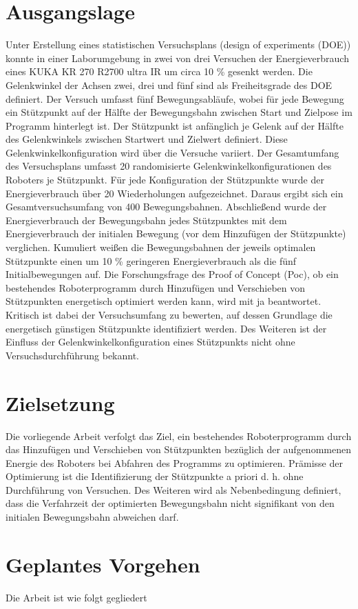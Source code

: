 \section{Ausgangslage}
Unter Erstellung eines statistischen Versuchsplans (design of experiments (DOE)) konnte in einer Laborumgebung in zwei von drei Versuchen der Energieverbrauch eines KUKA KR 270 R2700 ultra IR um circa 10 \% gesenkt werden. Die Gelenkwinkel der Achsen zwei, drei und fünf sind als Freiheitsgrade des DOE definiert. Der Versuch umfasst fünf Bewegungsabläufe, wobei für jede Bewegung ein Stützpunkt auf der Hälfte der Bewegungsbahn zwischen Start und Zielpose im Programm hinterlegt ist. Der Stützpunkt ist anfänglich je Gelenk auf der Hälfte des Gelenkwinkels zwischen Startwert und Zielwert definiert. Diese Gelenkwinkelkonfiguration wird über die Versuche variiert. Der Gesamtumfang des Versuchsplans umfasst 20 randomisierte Gelenkwinkelkonfigurationen des Roboters je Stützpunkt. Für jede Konfiguration der Stützpunkte wurde der Energieverbrauch über 20 Wiederholungen aufgezeichnet. Daraus ergibt sich ein Gesamtversuchsumfang von 400 Bewegungsbahnen. Abschließend wurde der Energieverbrauch der Bewegungsbahn jedes Stützpunktes mit dem Energieverbrauch der initialen Bewegung (vor dem Hinzufügen der Stützpunkte) verglichen. Kumuliert weißen die Bewegungsbahnen der jeweils optimalen Stützpunkte einen um 10 \% geringeren Energieverbrauch als die fünf Initialbewegungen auf. Die Forschungsfrage des Proof of Concept (Poc), ob ein bestehendes Roboterprogramm durch Hinzufügen und Verschieben von Stützpunkten energetisch optimiert werden kann, wird mit ja beantwortet. Kritisch ist dabei der Versuchsumfang zu bewerten, auf dessen Grundlage die energetisch günstigen Stützpunkte identifiziert werden. Des Weiteren ist der Einfluss der Gelenkwinkelkonfiguration eines Stützpunkts nicht ohne Versuchsdurchführung  bekannt.
\section{Zielsetzung}
Die vorliegende Arbeit verfolgt das Ziel, ein bestehendes Roboterprogramm durch das Hinzufügen und Verschieben von Stützpunkten bezüglich der aufgenommenen Energie des Roboters bei Abfahren des Programms zu optimieren. Prämisse der Optimierung ist die Identifizierung der Stützpunkte a priori d. h. ohne Durchführung von Versuchen. Des Weiteren wird als Nebenbedingung definiert, dass die Verfahrzeit der optimierten Bewegungsbahn nicht signifikant von den initialen Bewegungsbahn abweichen darf.
\section{Geplantes Vorgehen}
Die Arbeit ist wie folgt gegliedert